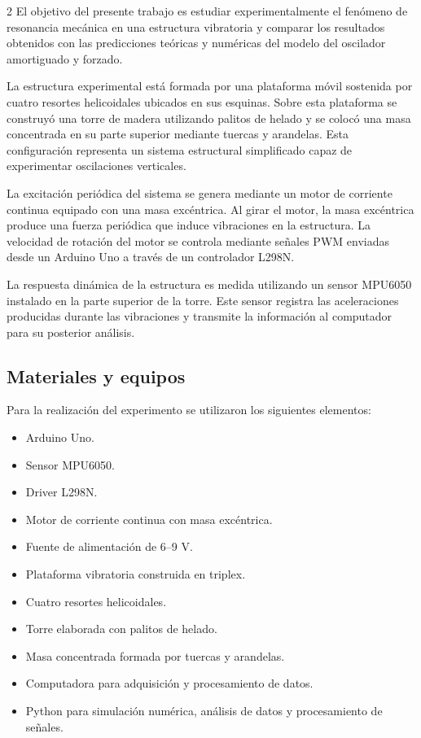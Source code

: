 \documentclass[10pt]{article}
\begin{document}
\begin{multicols}{2}
El objetivo del presente trabajo es estudiar experimentalmente el fenómeno de resonancia mecánica en una estructura vibratoria y comparar los resultados obtenidos con las predicciones teóricas y numéricas del modelo del oscilador amortiguado y forzado.

La estructura experimental está formada por una plataforma móvil sostenida por cuatro resortes helicoidales ubicados en sus esquinas. Sobre esta plataforma se construyó una torre de madera utilizando palitos de helado y se colocó una masa concentrada en su parte superior mediante tuercas y arandelas. Esta configuración representa un sistema estructural simplificado capaz de experimentar oscilaciones verticales.

La excitación periódica del sistema se genera mediante un motor de corriente continua equipado con una masa excéntrica. Al girar el motor, la masa excéntrica produce una fuerza periódica que induce vibraciones en la estructura. La velocidad de rotación del motor se controla mediante señales PWM enviadas desde un Arduino Uno a través de un controlador L298N.

La respuesta dinámica de la estructura es medida utilizando un sensor MPU6050 instalado en la parte superior de la torre. Este sensor registra las aceleraciones producidas durante las vibraciones y transmite la información al computador para su posterior análisis.

\subsection{Materiales y equipos}

Para la realización del experimento se utilizaron los siguientes elementos:

\begin{itemize}
    \item Arduino Uno.
    \item Sensor MPU6050.
    \item Driver L298N.
    \item Motor de corriente continua con masa excéntrica.
    \item Fuente de alimentación de 6--9 V.
    \item Plataforma vibratoria construida en triplex.
    \item Cuatro resortes helicoidales.
    \item Torre elaborada con palitos de helado.
    \item Masa concentrada formada por tuercas y arandelas.
    \item Computadora para adquisición y procesamiento de datos.
    \item Python para simulación numérica, análisis de datos y procesamiento de señales.
\end{itemize}


\end{multicols}
\end{document}
